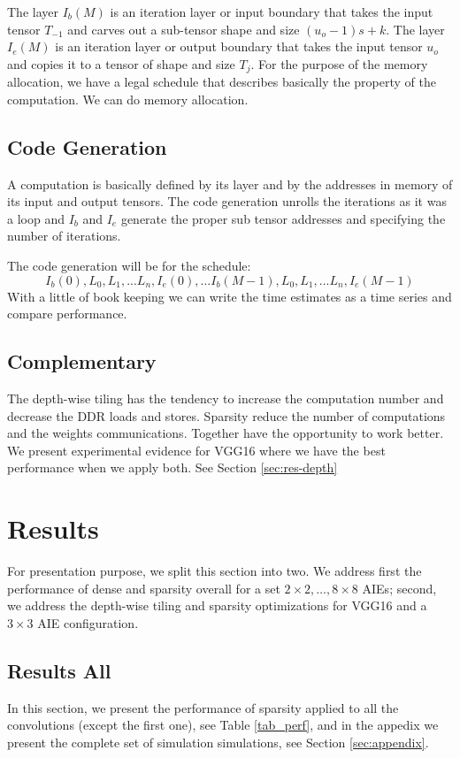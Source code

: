 \documentclass[conference]{IEEEtran}
\begin{document}
The layer $I_b(M)$ is an iteration layer or input boundary that takes
the input tensor $T_{-1}$ and carves out a sub-tensor shape and size
$(u_o-1)s+k$. The layer $I_e(M)$ is an iteration layer or output
boundary that takes the input tensor $u_o$ and copies it to a tensor
of shape and size $T_j$. For the purpose of the memory allocation, we
have a legal schedule that describes basically the property of the
computation.  We can do memory allocation.

\subsection{Code Generation}
A computation is basically defined by its layer and by the addresses
in memory of its input and output tensors. The code generation unrolls
the iterations as it was a loop and $I_b$ and $I_e$ generate the
proper sub tensor addresses and specifying the number of iterations.

The code generation will be for the schedule:
\[ I_b(0), L_0, L_1, ... L_n, I_e(0), \dots I_b(M-1), L_0, L_1, ... L_n, I_e(M-1) \]
With a little of book keeping we can write the time estimates as a
time series and compare performance.

\subsection{Complementary}
The depth-wise tiling has the tendency to increase the computation
number and decrease the DDR loads and stores. Sparsity reduce the
number of computations and the weights communications. Together have
the opportunity to work better. We present experimental evidence for
VGG16 where we have the best performance when we apply both. See
Section \ref{sec:res-depth}

\section{Results}
For presentation purpose, we split this section into two. We address
first the performance of dense and sparsity overall for a set $2\times
2, \dots, 8\times 8$ AIEs; second, we address the depth-wise tiling and
sparsity optimizations for VGG16 and a $3\times 3$ AIE configuration.
 



\subsection{Results All}
\label{sec:experiments}
In this section, we present the performance of sparsity applied to all
the convolutions (except the first one), see Table \ref{tab_perf}, and
in the appedix we present the complete set of simulation simulations,
see Section \ref{sec:appendix}.
\end{document}
